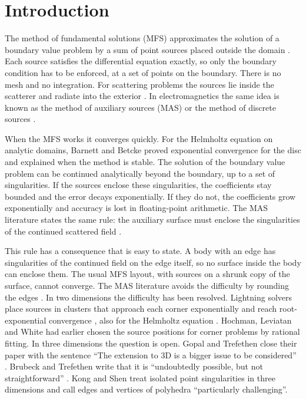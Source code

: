 \section{Introduction}
\label{sec:intro}

The method of fundamental solutions (MFS) approximates the solution of a boundary value problem by a sum of point sources placed outside the domain \cite{kupradze1964,fairweather1998}. Each source satisfies the differential equation exactly, so only the boundary condition has to be enforced, at a set of points on the boundary. There is no mesh and no integration. For scattering problems the sources lie inside the scatterer and radiate into the exterior \cite{fairweather2003}. In electromagnetics the same idea is known as the method of auxiliary sources (MAS) or the method of discrete sources \cite{kaklamani2002,doicu2000}.

When the MFS works it converges quickly. For the Helmholtz equation on analytic domains, Barnett and Betcke \cite{barnett2008} proved exponential convergence for the disc and explained when the method is stable. The solution of the boundary value problem can be continued analytically beyond the boundary, up to a set of singularities. If the sources enclose these singularities, the coefficients stay bounded and the error decays exponentially. If they do not, the coefficients grow exponentially and accuracy is lost in floating-point arithmetic. The MAS literature states the same rule: the auxiliary surface must enclose the singularities of the continued scattered field \cite{leviatan1990,zaridze2002,fikioris2006,tsitsas2018,kyurkchan1996}.

This rule has a consequence that is easy to state. A body with an edge has singularities of the continued field on the edge itself, so no surface inside the body can enclose them. The usual MFS layout, with sources on a shrunk copy of the surface, cannot converge. The MAS literature avoids the difficulty by rounding the edges \cite{bogdanov1999}. In two dimensions the difficulty has been resolved. Lightning solvers place sources in clusters that approach each corner exponentially and reach root-exponential convergence \cite{gopal2019siam,gopal2019pnas}, also for the Helmholtz equation \cite{ginn2023}. Hochman, Leviatan and White \cite{hochman2013} had earlier chosen the source positions for corner problems by rational fitting. In three dimensions the question is open. Gopal and Trefethen close their paper with the sentence ``The extension to 3D is a bigger issue to be considered'' \cite{gopal2019siam}. Brubeck and Trefethen write that it is ``undoubtedly possible, but not straightforward'' \cite{brubeck2022}. Kong and Shen \cite{kong2026} treat isolated point singularities in three dimensions and call edges and vertices of polyhedra ``particularly challenging''.

